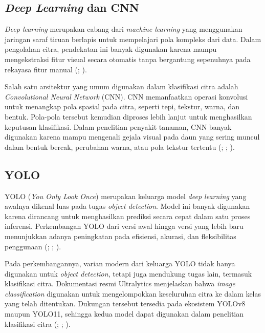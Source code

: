 \begin{sectioncontent}
    \subsection{\textit{Deep Learning} dan CNN}
    \begin{subsectioncontent}
        \hspace{\parindent}\textit{Deep learning} merupakan cabang dari \textit{machine learning} yang menggunakan jaringan saraf tiruan berlapis untuk mempelajari pola kompleks dari data. Dalam pengolahan citra, pendekatan ini banyak digunakan karena mampu mengekstraksi fitur visual secara otomatis tanpa bergantung sepenuhnya pada rekayasa fitur manual (\citealp[hlm. 1--2]{jackulin2022plantreview}; \citealp[hlm. 1]{nyawose2025plantreview}).

        Salah satu arsitektur yang umum digunakan dalam klasifikasi citra adalah \textit{Convolutional Neural Network} (CNN). CNN memanfaatkan operasi konvolusi untuk menangkap pola spasial pada citra, seperti tepi, tekstur, warna, dan bentuk. Pola-pola tersebut kemudian diproses lebih lanjut untuk menghasilkan keputusan klasifikasi. Dalam penelitian penyakit tanaman, CNN banyak digunakan karena mampu mengenali gejala visual pada daun yang sering muncul dalam bentuk bercak, perubahan warna, atau pola tekstur tertentu (\citealp[hlm. 1--3]{jelali2024tomatoreview}; \citealp[hlm. 192--193 dan 199--200]{das2025tomatoreview}; \citealp[hlm. 1--2 dan 7--9]{sun2024tomatoclassification}).
    \end{subsectioncontent}

    \subsection{YOLO}
    \begin{subsectioncontent}
        \hspace{\parindent}YOLO (\textit{You Only Look Once}) merupakan keluarga model \textit{deep learning} yang awalnya dikenal luas pada tugas \textit{object detection}. Model ini banyak digunakan karena dirancang untuk menghasilkan prediksi secara cepat dalam satu proses inferensi. Perkembangan YOLO dari versi awal hingga versi yang lebih baru menunjukkan adanya peningkatan pada efisiensi, akurasi, dan fleksibilitas penggunaan (\citealp[hlm. 1680--1683]{terven2023yolo}; \citealp[hlm. 1--3]{ali2024yoloframework}; \citealp[hlm. 1--3]{murat2025yolo}).

        Pada perkembangannya, varian modern dari keluarga YOLO tidak hanya digunakan untuk \textit{object detection}, tetapi juga mendukung tugas lain, termasuk klasifikasi citra. Dokumentasi resmi Ultralytics menjelaskan bahwa \textit{image classification} digunakan untuk mengelompokkan keseluruhan citra ke dalam kelas yang telah ditentukan. Dukungan tersebut tersedia pada ekosistem YOLOv8 maupun YOLO11, sehingga kedua model dapat digunakan dalam penelitian klasifikasi citra (\citealp[bagian \textit{Image Classification}]{ultralyticsclassify}; \citealp[bagian \textit{YOLOv8 Models}]{ultralyticsyolov8}; \citealp[bagian \textit{YOLO11 Models}]{ultralyticsyolo11}).


\end{subsectioncontent}
\end{sectioncontent}
